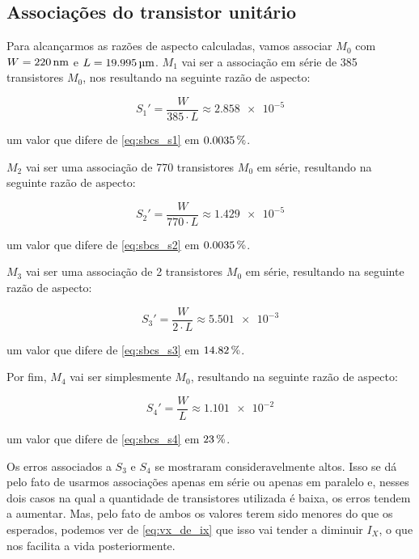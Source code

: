 \documentclass[10pt,a4paper]{extreport}
\newcommand{\?}{\stackrel{?}{=}}
\newcommand{\sis}[2]{\complexnum{#1}\,\si[per-mode=symbol]{#2}}
\begin{document}
\subsection{Associações do transistor unitário}

Para alcançarmos as razões de aspecto calculadas, vamos associar $M_0$ com $W=\sis{220}{\nano\meter}$ e $L=\sis{19.995}{\micro\meter}$. $M_1$ vai ser a associação em série de 385 transistores $M_0$, nos resultando na seguinte razão de aspecto:

\begin{equation}
    \label{eq:associacao_s1}
    S_1'=\frac{W}{385\cdot L}\approx\num{2.858e-5}
\end{equation}

\noindent um valor que difere de \eqref{eq:sbcs_s1} em $\sis{0.0035}{\percent}$.

$M_2$ vai ser uma associação de 770 transistores $M_0$ em série, resultando na seguinte razão de aspecto:

\begin{equation}
    \label{eq:associacao_s2}
    S_2'=\frac{W}{770\cdot L}\approx\num{1.429e-5}
\end{equation}

\noindent um valor que difere de \eqref{eq:sbcs_s2} em $\sis{0.0035}{\percent}$.

$M_3$ vai ser uma associação de 2 transistores $M_0$ em série, resultando na seguinte razão de aspecto:

\begin{equation}
    \label{eq:associacao_s3}
    S_3'=\frac{W}{2\cdot L}\approx\num{5.501e-3}
\end{equation}

\noindent um valor que difere de \eqref{eq:sbcs_s3} em $\sis{14.82}{\percent}$.

Por fim, $M_4$ vai ser simplesmente $M_0$, resultando na seguinte razão de aspecto:

\begin{equation}
    \label{eq:associacao_s4}
    S_4'=\frac{W}{L}\approx\num{1.101e-2}
\end{equation}

\noindent um valor que difere de \eqref{eq:sbcs_s4} em $\sis{23}{\percent}$.

Os erros associados a $S_3$ e $S_4$ se mostraram consideravelmente altos. Isso se dá pelo fato de usarmos associações apenas em série ou apenas em paralelo e, nesses dois casos na qual a quantidade de transistores utilizada é baixa, os erros tendem a aumentar. Mas, pelo fato de ambos os valores terem sido menores do que os esperados, podemos ver de \eqref{eq:vx_de_ix} que isso vai tender a diminuir $I_X$, o que nos facilita a vida posteriormente.
\end{document}
